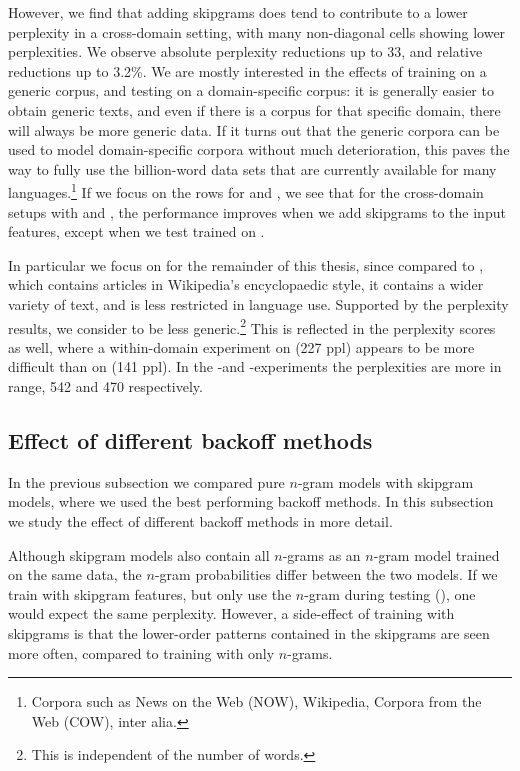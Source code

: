 However, we find that adding skipgrams does tend to contribute to a lower perplexity in a cross-domain setting, with many non-diagonal cells showing lower perplexities. We observe absolute perplexity reductions up to 33, and relative reductions up to 3.2\%. We are mostly interested in the effects of training on a generic corpus, and testing on a domain-specific corpus: it is generally easier to obtain generic texts, and even if there is a corpus for that specific domain, there will always be more generic data. If it turns out that the generic corpora can be used to model domain-specific corpora without much deterioration, this paves the way to fully use the billion-word data sets that are currently available for many languages.\footnote{Corpora such as News on the Web (NOW), Wikipedia, Corpora from the Web (COW), inter alia.} If we focus on the rows for \obw and \wp, we see that for the cross-domain setups with \jrc and \emea, the performance improves when we add skipgrams to the input features, except when we test \jrc trained on \wp.

In particular we focus on \obw for the remainder of this thesis, since compared to \wp, which contains articles in Wikipedia's encyclopaedic style, it contains a wider variety of text, and is less restricted in language use. Supported by the perplexity results, we consider \wp to be less generic.\footnote{This is independent of the number of words.} This is reflected in the perplexity scores as well, where a within-domain experiment on \wp (227 ppl) appears to be more difficult than on \obw (141 ppl). In the \obw-\wp and \wp-\obw experiments the perplexities are more in range, 542 and 470 respectively.

\subsection{Effect of different backoff methods}
In the previous subsection we compared pure $n$-gram models with skipgram models, where we used the best performing backoff methods. In this subsection we study the effect of different backoff methods in more detail. 

Although skipgram models also contain all $n$-grams as an $n$-gram model trained on the same data, the $n$-gram probabilities differ between the two models. If we train with skipgram features, but only use the $n$-gram during testing (\BON), one would expect the same perplexity. However, a side-effect of training with skipgrams is that the lower-order patterns contained in the skipgrams are seen more often, compared to training with only $n$-grams.

